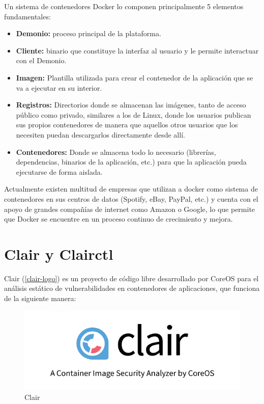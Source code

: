 Un sistema de contenedores Docker lo componen principalmente 5 elementos fundamentales:

\begin{itemize}
	\item \textbf{Demonio:} proceso principal de la plataforma.
	\item \textbf{Cliente:} binario que constituye la interfaz al usuario y le permite interactuar con el Demonio.
	\item \textbf{Imagen:} Plantilla utilizada para crear el contenedor de la aplicación que se va a ejecutar en su interior.
	\item \textbf{Registros:} Directorios donde se almacenan las imágenes, tanto de acceso público como privado, similares a los de Linux, donde los usuarios publican sus propios contenedores de manera que aquellos otros usuarios que los necesiten puedan descargarlos directamente desde allí.
	\item \textbf{Contenedores:} Donde se almacena todo lo necesario (librerías, dependencias, binarios de la aplicación, etc.) para que la aplicación pueda ejecutarse de forma aislada.
\end{itemize}

Actualmente existen multitud de empresas que utilizan a docker como sistema de contenedores en sus centros de datos (Spotify, eBay, PayPal, etc.) y cuenta con el apoyo de grandes compañías de internet como Amazon o Google, lo que permite que Docker se encuentre en un proceso continuo de crecimiento y mejora.


\section{Clair y Clairctl}

Clair (\autoref{clair-logo}) es un proyecto de código libre desarrollado por CoreOS para el análisis estático de vulnerabilidades en contenedores de aplicaciones, que funciona de la siguiente manera\cite{clair2017}:

\begin{figure}[htbp]
	\centering
	\includegraphics[width=0.80\linewidth]
	{entorno/figuras/clair.png}
	\caption{Clair}
	\label{clair-logo}
\end{figure}

